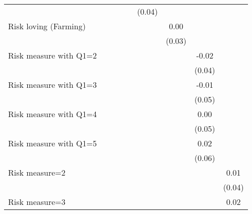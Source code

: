 \begin{table}[htbp]
\begin{threeparttable}
\begin{tabular}{l cccccccc}
                    &               &               &               &               &      (0.04)   &               &               &               \\
Risk loving (Farming)&               &               &               &               &               &        0.00   &               &               \\
                    &               &               &               &               &               &      (0.03)   &               &               \\
Risk measure with Q1=2&               &               &               &               &               &               &       -0.02   &               \\
                    &               &               &               &               &               &               &      (0.04)   &               \\
Risk measure with Q1=3&               &               &               &               &               &               &       -0.01   &               \\
                    &               &               &               &               &               &               &      (0.05)   &               \\
Risk measure with Q1=4&               &               &               &               &               &               &        0.00   &               \\
                    &               &               &               &               &               &               &      (0.05)   &               \\
Risk measure with Q1=5&               &               &               &               &               &               &        0.02   &               \\
                    &               &               &               &               &               &               &      (0.06)   &               \\
Risk measure=2      &               &               &               &               &               &               &               &        0.01   \\
                    &               &               &               &               &               &               &               &      (0.04)   \\
Risk measure=3      &               &               &               &               &               &               &               &        0.02   \\

\end{tabular}
\end{threeparttable}
\end{table}
